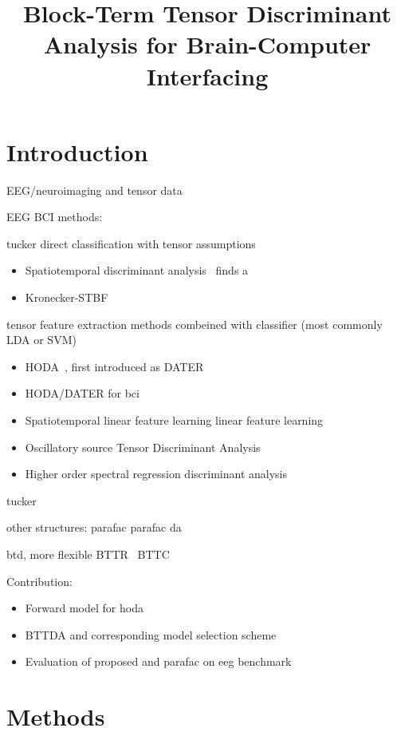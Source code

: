\documentclass[twocolumn]{article}
\title{Block-Term Tensor Discriminant Analysis for Brain-Computer Interfacing}
\begin{document}
\maketitle

\section{Introduction}

EEG/neuroimaging and tensor data



EEG BCI methods:

tucker
direct classification with tensor assumptions
\begin{itemize}
  \item Spatiotemporal discriminant analysis~\cite{Li2010,Zhang2013} finds a
  \item Kronecker-STBF~\cite{Kerchove2022}
\end{itemize}


tensor feature extraction methods
combeined with classifier (most commonly LDA or SVM)
\begin{itemize}

  \item HODA~\cite{Phan2010}, first introduced as DATER~\cite{Yan2005}
  \item HODA/DATER for bci~\cite{Onishi2012,Liu2015,Higashi2016,Cai2021}
  \item Spatiotemporal linear feature learning linear feature
    learning~\cite{Aghili2023}
  \item Oscillatory source Tensor Discriminant Analysis~\cite{Jorajuria2022}
  \item Higher order spectral regression discriminant
    analysis~\cite{Jamshidi2017}
\end{itemize}

tucker

other structures:
 parafac
 parafac da~\cite{Froelich2018}

 btd, more flexible
 BTTR~\cite{Faes2022,Faes2022b} BTTC~\cite{Camarrone2021}



Contribution:
\begin{itemize}
  \item Forward model for hoda
  \item BTTDA and corresponding model selection scheme
  \item Evaluation of proposed and parafac on eeg benchmark
\end{itemize}
\section{Methods}
\end{document}
